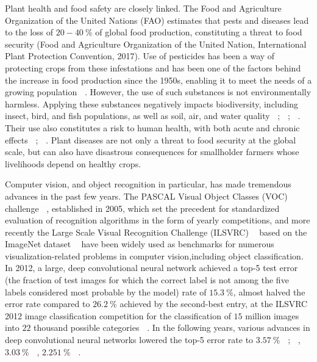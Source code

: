 \documentclass[12pt]{report}
\numberwithin{equation}{section}
\begin{document}
Plant health and food safety are closely linked. The Food and Agriculture Organization of the United Nations (FAO) estimates that pests and diseases lead to the loss of $20-40\ \%$ of global food production, constituting a threat to food security (Food and Agriculture Organization of the United Nation, International Plant Protection Convention, 2017). Use of pesticides has been a way of protecting crops from these infestations and has been one of the factors behind the increase in food production since the 1950s, enabling it to meet the needs of a growing population \textbf{~\cite{cooper}}. However, the use of such substances is not environmentally harmless. Applying these substances negatively impacts biodiversity, including insect, bird, and fish populations, as well as soil, air, and water quality \textbf{~\cite{kaur}}; \textbf{~\cite{bayo}}; \textbf{~\cite{Knillmann}}. Their use also constitutes a risk to human health, with both acute and chronic effects \textbf{~\cite{sanborn}}; \textbf{~\cite{KIM2017525}}. Plant diseases are not only a threat to food security at the global scale, but can also have disastrous consequences for smallholder farmers whose livelihoods depend on healthy crops.

Computer vision, and object recognition in particular, has made tremendous advances in the past few years. The PASCAL Visual Object Classes (VOC) challenge \textbf{~\cite{Everingham}}, established in 2005, which set the precedent for standardized evaluation of recognition algorithms in the form of yearly competitions, and more recently the Large Scale Visual Recognition Challenge (ILSVRC) \textbf{~\cite{Russakovsky}} based on the ImageNet dataset \textbf{~\cite{Deng}} have been widely used as benchmarks for numerous visualization-related problems in computer vision,including object classification. In 2012, a large, deep convolutional neural network achieved a top-5 test error (the fraction of test images for which the correct label is not among the five labels considered most probable by the model) rate of $15.3\ \%$, almost halved the error rate compared
to $26.2\ \%$ achieved by the second-best entry, at the ILSVRC 2012 image classification competition for the classification of $15$ million images into $22$ thousand possible categories \textbf{~\cite{Krizhevsky}}. In the following years, various advances in deep convolutional neural networks lowered the top-5 error rate to $3.57\ \%$ \textbf{~\cite{He2015DeepRL}}; \textbf{~\cite{Szegedy}}, $3.03\ \%$ \textbf{~\cite{Xie}}, $2.251\ \%$ \textbf{~\cite{Hu2017SqueezeandExcitationN}}.
\end{document}
